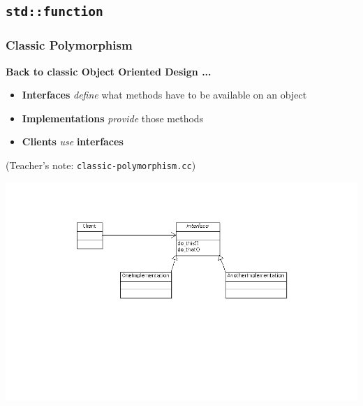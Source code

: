 \subsection{\texttt{std::function}}

\begin{frame}
  \frametitle{Classic Polymorphism}

  \textbf{Back to classic Object Oriented Design ...}

  \begin{itemize}
  \item \textbf{Interfaces} \textit{define} what methods have to be
    available on an object
  \item \textbf{Implementations} \textit{provide} those methods
  \item \textbf{Clients} \textit{use} \textbf{interfaces}
  \end{itemize}

  (Teacher's note: \texttt{classic-polymorphism.cc})

  \begin{block}{}
    \begin{center}
      \includegraphics[height=0.9\textheight]{function-classic-polymorphism.png}
    \end{center}
  \end{block}

\end{frame}

